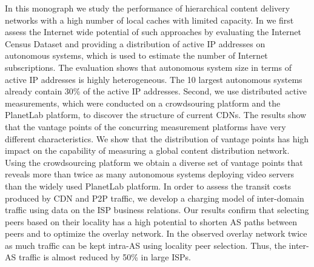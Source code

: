 In this monograph we study the performance of hierarchical content delivery networks with a high number of local caches with limited capacity.
In  we first assess the Internet wide potential of such approaches by evaluating the Internet Census Dataset and providing a distribution of active IP addresses on autonomous systems, which is used to estimate the number of Internet subscriptions.
The evaluation shows that autonomous system size in terms of active IP addresses is highly heterogeneous.
The 10 largest autonomous systems already contain 30\% of the active IP addresses.
Second, we use distributed active measurements, which were conducted on a crowdsouring platform and the PlanetLab platform, to discover the structure of current CDNs.
The results show that the vantage points of the concurring measurement platforms have very different characteristics.
We show that the distribution of vantage points has high impact on the capability of measuring a global content distribution network.
Using the crowdsourcing platform we obtain a diverse set of vantage points that reveals more than twice as many autonomous systems deploying video servers than the widely used PlanetLab platform.
In order to assess the transit costs produced by CDN and P2P traffic, we develop a charging model of inter-domain traffic using data on the ISP business relations.
Our results confirm that selecting peers based on their locality has a high potential to shorten AS paths between peers and to optimize the overlay network. In the observed overlay network twice as much traffic can be kept intra-AS using locality peer selection.
Thus, the inter-AS traffic is almost reduced by 50\% in large ISPs.

